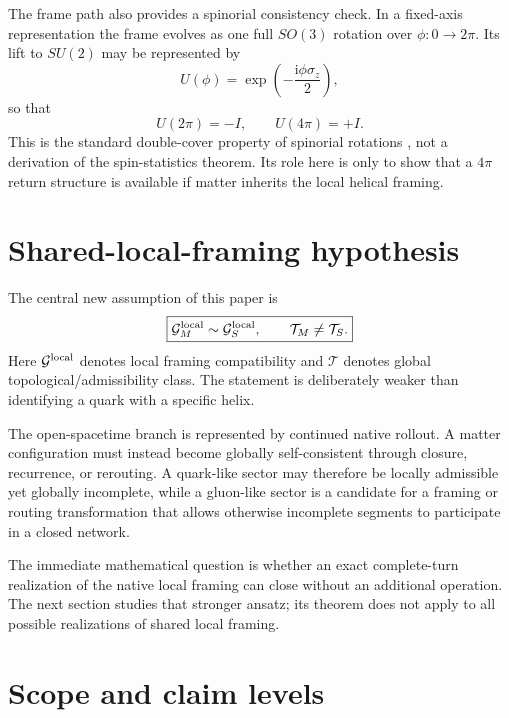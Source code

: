 \documentclass[10pt]{article}
\newcommand{\ii}{\mathrm{i}}
\begin{document}
The frame path also provides a spinorial consistency check. In a fixed-axis representation the frame evolves as one full $SO(3)$ rotation over $\phi:0\rightarrow2\pi$. Its lift to $SU(2)$ may be represented by
\begin{equation}
U(\phi)=\exp\!\left(-\frac{\ii\phi\sigma_z}{2}\right),
\end{equation}
so that
\begin{equation}
U(2\pi)=-I,
\qquad
U(4\pi)=+I.
\label{eq:4pi}
\end{equation}
This is the standard double-cover property of spinorial rotations \cite{Sakurai2020}, not a derivation of the spin-statistics theorem. Its role here is only to show that a $4\pi$ return structure is available if matter inherits the local helical framing.

\section{Shared-local-framing hypothesis}
\label{sec:shared}

The central new assumption of this paper is
\begin{equation}
\boxed{
\mathcal G_M^{\rm local}
\sim
\mathcal G_S^{\rm local},
\qquad
\mathcal T_M\neq\mathcal T_S.
}
\label{eq:sharedHypothesis}
\end{equation}
Here $\mathcal G^{\rm local}$ denotes local framing compatibility and $\mathcal T$ denotes global topological/admissibility class. The statement is deliberately weaker than identifying a quark with a specific helix.

The open-spacetime branch is represented by continued native rollout. A matter configuration must instead become globally self-consistent through closure, recurrence, or rerouting. A quark-like sector may therefore be locally admissible yet globally incomplete, while a gluon-like sector is a candidate for a framing or routing transformation that allows otherwise incomplete segments to participate in a closed network.

The immediate mathematical question is whether an exact complete-turn realization of the native local framing can close without an additional operation. The next section studies that stronger ansatz; its theorem does not apply to all possible realizations of shared local framing.

\section{Scope and claim levels}
\label{sec:scope}
\end{document}
